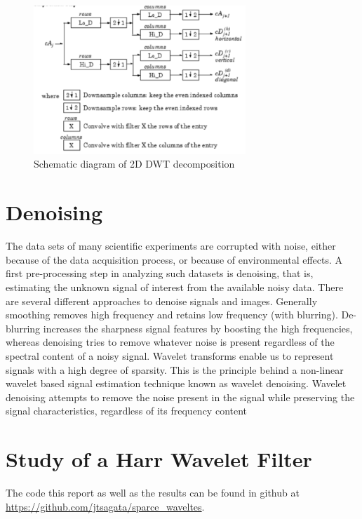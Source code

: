 \documentclass[a4paper,12pt]{article}
\begin{document}
\begin{figure}[]
        \centering
        \includegraphics[width=8cm]{diagram2.png}
        \caption{Schematic diagram of 2D DWT decomposition}
		\label{fig:wave2}
\end{figure}


\section {Denoising}
The data sets of many scientific experiments are corrupted with noise, either because of the data acquisition process, or because of environmental effects. A first pre-processing step in analyzing such datasets is denoising, that is, estimating the unknown signal of interest from the available noisy data. There are several different approaches to denoise signals and images. Generally smoothing removes high frequency and retains low frequency (with blurring). De-blurring increases the sharpness signal features by boosting the high frequencies, whereas denoising tries to remove whatever noise is present regardless of the spectral content of a noisy signal. Wavelet transforms enable us to represent signals with a high degree of sparsity. This is the principle behind a non-linear wavelet based signal estimation technique known as wavelet denoising. Wavelet denoising attempts to remove the noise present in the signal while preserving the signal characteristics, regardless of its frequency content

\section{Study of a Harr Wavelet Filter}
The code this report as well as the results can be found in  github at \url{https://github.com/jtsagata/sparce_waveltes}.






%
\end{document}
